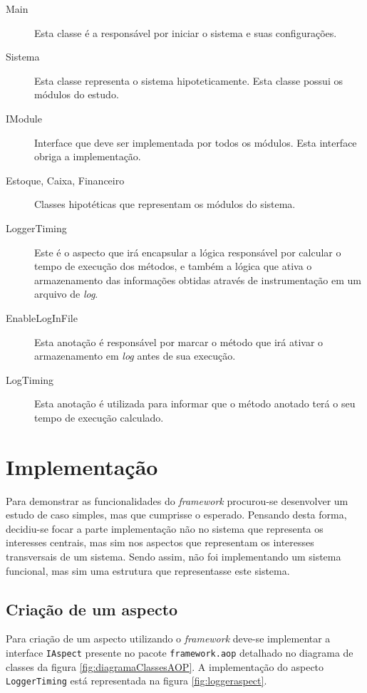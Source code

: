 \documentclass[tc,oneside]{iiufrgs}
\begin{document}
\begin{description}

\item [Main] Esta classe é a responsável por iniciar o sistema e suas configurações.
\item [Sistema] Esta classe representa o sistema hipoteticamente. Esta classe possui os módulos do estudo.
\item [IModule] Interface que deve ser implementada por todos os módulos. Esta interface obriga a implementação.
\item [Estoque, Caixa, Financeiro] Classes hipotéticas que representam os módulos do sistema.
\item [LoggerTiming] Este é o aspecto que irá encapsular a lógica responsável por calcular o tempo de execução dos métodos, e também a lógica que ativa o armazenamento das informações obtidas através de instrumentação em um arquivo de \textit{log}.
\item [EnableLogInFile] Esta anotação é responsável por marcar o método que irá ativar o armazenamento em \textit{log} antes de sua execução.
\item[LogTiming] Esta anotação é utilizada para informar que o método anotado terá o seu tempo de execução calculado.
\end{description}

\section{Implementação}

Para demonstrar as funcionalidades do \textit{framework} procurou-se desenvolver um estudo de caso simples, mas que cumprisse o esperado. Pensando desta forma, decidiu-se focar a parte implementação não no sistema que representa os interesses centrais, mas sim nos aspectos que representam os interesses transversais de um sistema. Sendo assim, não foi implementando um sistema funcional, mas sim uma estrutura que representasse este sistema.

\subsection{Criação de um aspecto}

Para criação de um aspecto utilizando o \textit{framework} deve-se implementar a interface \texttt{IAspect} presente no pacote \texttt{framework.aop} detalhado no diagrama de classes da figura \ref{fig:diagramaClassesAOP}. A implementação do aspecto \texttt{LoggerTiming} está representada na figura \ref{fig:loggeraspect}.
\end{document}
